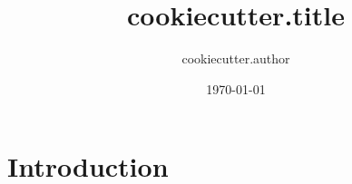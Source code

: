 \documentclass[a4paper]{scrartcl}
\title{ %
{{cookiecutter.title}}%
}
\author{ %
{{cookiecutter.author}}%
}
\date{\today}
\begin{document}
\maketitle

\section*{Introduction}
\end{document}
